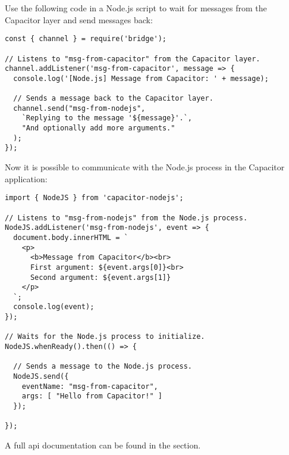 Use the following code in a Node.js script to wait for messages from the Capacitor layer and send messages back:

\begin{verbatim}
const { channel } = require('bridge');

// Listens to "msg-from-capacitor" from the Capacitor layer.
channel.addListener('msg-from-capacitor', message => {
  console.log('[Node.js] Message from Capacitor: ' + message);
  
  // Sends a message back to the Capacitor layer.
  channel.send("msg-from-nodejs",
    `Replying to the message '${message}'.`,
    "And optionally add more arguments."
  );
});
\end{verbatim}

\vspace{1em}

Now it is possible to communicate with the Node.js process in the Capacitor application:

\begin{verbatim}
import { NodeJS } from 'capacitor-nodejs';

// Listens to "msg-from-nodejs" from the Node.js process.
NodeJS.addListener('msg-from-nodejs', event => {
  document.body.innerHTML = `
    <p>
      <b>Message from Capacitor</b><br>
      First argument: ${event.args[0]}<br>
      Second argument: ${event.args[1]}
    </p>
  `;
  console.log(event);
});

// Waits for the Node.js process to initialize.
NodeJS.whenReady().then(() => {

  // Sends a message to the Node.js process.
  NodeJS.send({
    eventName: "msg-from-capacitor",
    args: [ "Hello from Capacitor!" ]
  });

});
\end{verbatim}

A full \ac{api} documentation can be found in the  section.
